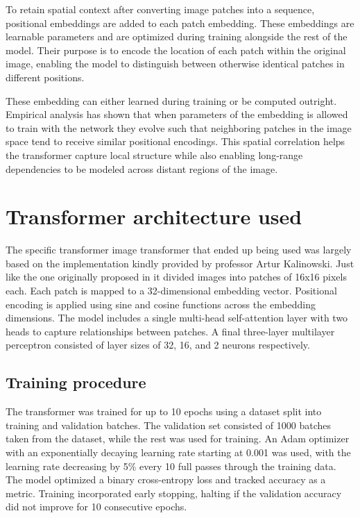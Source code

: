 \documentclass{pracalicmgr}
\begin{document}
To retain spatial context after converting image patches into a sequence, positional embeddings are added to each patch embedding. These embeddings are learnable parameters and are optimized during training alongside the rest of the model. Their purpose is to encode the location of each patch within the original image, enabling the model to distinguish between otherwise identical patches in different positions.

These embedding can either learned during training or be computed outright. Empirical analysis has shown that when parameters of the embedding is allowed to train with the network they evolve such that neighboring patches in the image space tend to receive similar positional encodings. This spatial correlation helps the transformer capture local structure while also enabling long-range dependencies to be modeled across distant regions of the image.


\section{Transformer architecture used}

The specific transformer image transformer that ended up being used was largely based on the implementation kindly provided by professor Artur Kalinowski. Just like the one originally proposed in \cite{ViT} it divided images into patches of 16x16 pixels each. Each patch is mapped to a 32-dimensional embedding vector. Positional encoding is applied using sine and cosine functions across the embedding dimensions. The model includes a single multi-head self-attention layer with two heads to capture relationships between patches. A final three-layer multilayer perceptron consisted of layer sizes of 32, 16, and 2 neurons respectively.

\subsection{Training procedure}

The transformer was trained for up to 10 epochs using a dataset split into training and validation batches. The validation set consisted of 1000 batches taken from the dataset, while the rest was used for training. An Adam optimizer with an exponentially decaying learning rate starting at 0.001 was used, with the learning rate decreasing by 5\% every 10 full passes through the training data. The model optimized a binary cross-entropy loss and tracked accuracy as a metric. Training incorporated early stopping, halting if the validation accuracy did not improve for 10 consecutive epochs.
\end{document}
